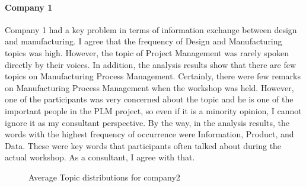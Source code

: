 \documentclass[senior]{IPSstyle}
\begin{document}
\paragraph{Company 1} Company 1 had a key problem in terms of information exchange between design and manufacturing. I agree that the frequency of Design and Manufacturing topics was high. However, the topic of Project Management was rarely spoken directly by their voices. In addition, the analysis results show that there are few topics on Manufacturing Process Management. Certainly, there were few remarks on Manufacturing Process Management when the workshop was held. However, one of the participants was very concerned about the topic and he is one of the important people in the PLM project, so even if it is a minority opinion, I cannot ignore it as my consultant perspective. By the way, in the analysis results, the words with the highest frequency of occurrence were Information, Product, and Data. These were key words that participants often talked about during the actual workshop. As a consultant, I agree with that.

\begin{figure}[h]
    \begin{center}
    \end{center}
\vspace{-0.3cm}
    \caption{Average Topic distributions for company2}
    \label{fig_c2}
    \vspace{-0.3cm}
\end{figure} 
\end{document}
